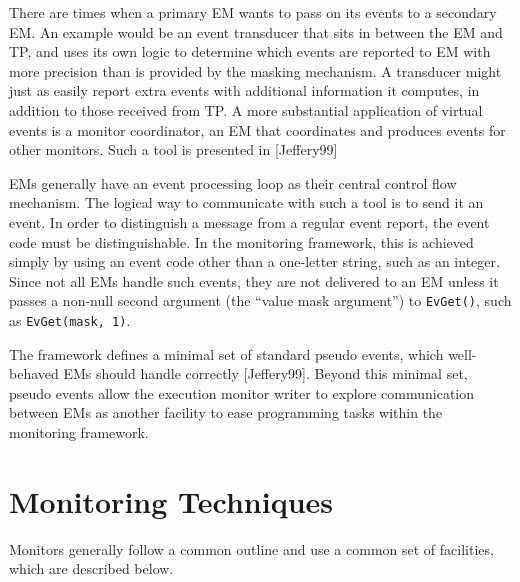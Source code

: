 There are times when a primary EM wants to pass on its events to a
secondary EM.  An example would be an event transducer that sits
in between the EM and TP, and uses its own logic to
determine which events are reported to EM with more precision
than is provided by the masking mechanism.  A transducer might just as
easily report extra events with additional information
it computes, in addition to those received from TP. 
A more substantial application of virtual events is a monitor
coordinator, an EM that coordinates and produces events for
other monitors.  Such a tool is presented in [Jeffery99]

\vspace{1pc}


\vspace{0.25pc}
\noindent
EMs generally have an event processing loop as their central
control flow mechanism.  The logical way to communicate with such a
tool is to send it an event.  In order to distinguish a message from a
regular event report, the event code must be distinguishable.  In the
monitoring framework, this is achieved simply by using an event code
other than a one-letter string, such as an integer.  Since not all EMs
handle such events, they are not delivered to an EM unless it passes a
non-null second argument (the ``value mask argument'') to {\tt EvGet()},
such as {\tt EvGet(mask,~1)}.

The framework defines a minimal set of standard pseudo events, which
well-behaved EMs should handle correctly [Jeffery99].  Beyond this
minimal set, pseudo events allow
the execution monitor writer to explore communication between EMs as
another facility to ease programming tasks within the monitoring
framework.


\section{Monitoring Techniques}

Monitors generally follow a common outline and use a common set of
facilities, which are described below.

